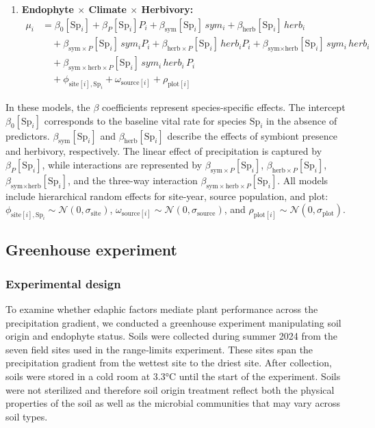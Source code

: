 \documentclass[12pt]{article}\usepackage[]{graphicx}\usepackage[dvipsnames]{xcolor}
\begin{document}
{\begin{enumerate}
    \item \textbf{Endophyte $\times$ Climate $\times$ Herbivory:}
    \begin{align*}
    \mu_i &= \beta_0[\text{Sp}_i] + \beta_P[\text{Sp}_i] P_i
            + \beta_{\text{sym}}[\text{Sp}_i]\,sym_i
            + \beta_{\text{herb}}[\text{Sp}_i]\,herb_i \\
    &\quad + \beta_{\text{sym}\times P}[\text{Sp}_i]\,sym_i P_i
            + \beta_{\text{herb}\times P}[\text{Sp}_i]\,herb_i P_i
            + \beta_{\text{sym}\times \text{herb}}[\text{Sp}_i]\,sym_i\,herb_i \\
    &\quad + \beta_{\text{sym}\times \text{herb} \times P}[\text{Sp}_i]\,sym_i\,herb_i\,P_i \\
    &\quad + \phi_{\text{site}[i],\text{Sp}_i} + \omega_{\text{source}[i]} + \rho_{\text{plot}[i]}
    \end{align*}
\end{enumerate}
In these models, the $\beta$ coefficients represent species-specific effects.
The intercept $\beta_0[\text{Sp}_i]$ corresponds to the baseline vital rate for species $\text{Sp}_i$ in the absence of predictors.
$\beta_{\text{sym}}[\text{Sp}_i]$ and $\beta_{\text{herb}}[\text{Sp}_i]$ describe the effects of symbiont presence and herbivory, respectively.
The linear effect of precipitation is captured by $\beta_P[\text{Sp}_i]$, while interactions are represented by $\beta_{\text{sym}\times P}[\text{Sp}_i]$, $\beta_{\text{herb}\times P}[\text{Sp}_i]$,
$\beta_{\text{sym}\times \text{herb}}[\text{Sp}_i]$, and the three-way interaction $\beta_{\text{sym}\times \text{herb} \times P}[\text{Sp}_i]$.
All models include hierarchical random effects for site-year, source population, and plot: $\phi_{\text{site}[i],\text{Sp}_i} \sim \mathcal{N}(0, \sigma_{\text{site}})$, $\omega_{\text{source}[i]} \sim \mathcal{N}(0, \sigma_{\text{source}})$,
and $\rho_{\text{plot}[i]} \sim \mathcal{N}(0, \sigma_{\text{plot}})$.

\subsection{Greenhouse experiment}
\label{sec:greenhouse}

\subsubsection{Experimental design}

To examine whether edaphic factors mediate plant performance across the precipitation gradient, we conducted a greenhouse experiment
manipulating soil origin and endophyte status.
Soils were collected during summer 2024 from the seven field sites used in the range‐limits experiment.
These sites span the precipitation gradient from the wettest site to the driest site. 
After collection, soils were stored in a cold room at 3.3°C until the start of the experiment. 
Soils were not sterilized and therefore soil origin treatment reflect both the physical properties of the soil as well as the microbial communities that may vary across soil types.

}
\end{document}
